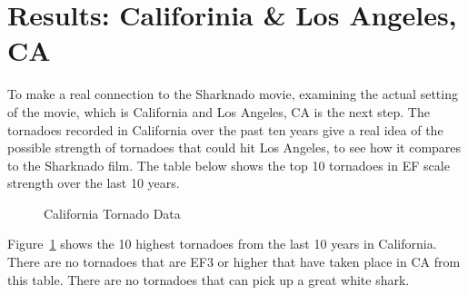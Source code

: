 \documentclass[
  letterpaper,
  DIV=11,
  numbers=noendperiod]{scrreprt}
\begin{document}
\section{Results: Califorinia \& Los Angeles,
CA}\label{results-califorinia-los-angeles-ca-1}

To make a real connection to the Sharknado movie, examining the actual
setting of the movie, which is California and Los Angeles, CA is the
next step. The tornadoes recorded in California over the past ten years
give a real idea of the possible strength of tornadoes that could hit
Los Angeles, to see how it compares to the Sharknado film. The table
below shows the top 10 tornadoes in EF scale strength over the last 10
years.

\begin{figure}


\caption{\label{fig-table5}California Tornado Data}

\end{figure}%

Figure~\ref{fig-table5} shows the 10 highest tornadoes from the last 10
years in California. There are no tornadoes that are EF3 or higher that
have taken place in CA from this table. There are no tornadoes that can
pick up a great white shark.
\end{document}
